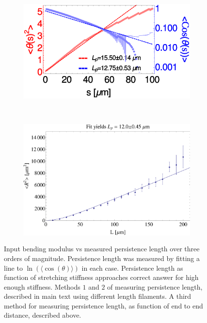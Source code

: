 \documentclass[11pt]{article}
\begin{document}
\begin{figure}[H]
  ~
  \begin{subfigure}{0.6\textwidth}
    \centering
    \includegraphics[width=\textwidth]{figs/filament/sAvgd_L1-100.eps}
    \caption{\label{fig:lp_vs_l}}
  \end{subfigure}
  ~
  \begin{subfigure}{0.4\textwidth}
    \centering
    \includegraphics[width=\textwidth]{figs/filament/R2vsL.eps}
    \caption{\label{fig:R2}}
  \end{subfigure}
  \label{fig:wlc_supp}
  \caption{
   Input bending modulus vs measured persistence length over three orders of magnitude. Persistence
  length was measured by fitting a line to $\ln{(\langle \cos{(\theta)}\rangle)}$ in each case.
    Persistence length as function of stretching stiffness approaches correct answer for high
  enough stiffness. 
  Methods $1$ and $2$ of measuring persistence length, described in main text using different length
  filaments.
   A third method for measuring persistence length, as function of end to end distance, described above.
}
\end{figure}
\end{document}
